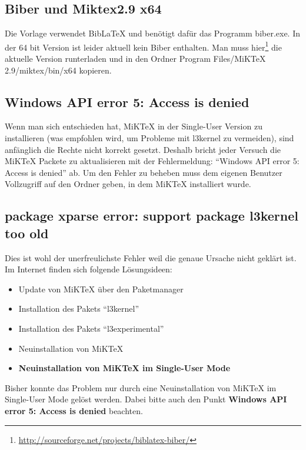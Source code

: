 \subsection{Biber und Miktex2.9 x64}
Die Vorlage verwendet BibLaTeX und benötigt dafür das Programm biber.exe.
In der 64 bit Version ist leider aktuell kein Biber enthalten.
Man muss hier\footnote{\url{http://sourceforge.net/projects/biblatex-biber/}} die aktuelle Version runterladen und in den Ordner Program Files/MiKTeX 2.9/miktex/bin/x64 kopieren.

\subsection{Windows API error 5: Access is denied}
Wenn man sich entschieden hat, MiKTeX in der Single-User Version zu installieren (was empfohlen wird, um Probleme mit l3kernel zu vermeiden), sind anfänglich die Rechte nicht korrekt gesetzt. 
Deshalb bricht jeder Versuch die MiKTeX Packete zu aktualisieren mit der Fehlermeldung: "`Windows API error 5: Access is denied"' ab.
Um den Fehler zu beheben muss dem eigenen Benutzer Vollzugriff auf den Ordner geben, in dem MiKTeX installiert wurde.

\subsection{package xparse error: support package l3kernel too old}
Dies ist wohl der unerfreulichste Fehler weil die genaue Ursache nicht geklärt ist.
Im Internet finden sich folgende Lösungsideen:
\begin{itemize}
	\item Update von MiKTeX über den Paketmanager
	\item Installation des Pakets "`l3kernel"'
	\item Installation des Pakets "`l3experimental"'
	\item Neuinstallation von MiKTeX
	\item \textbf{Neuinstallation von MiKTeX im Single-User Mode}
\end{itemize}
Bisher konnte das Problem nur durch eine Neuinstallation von MiKTeX im Single-User Mode gelöst werden. Dabei bitte auch den Punkt \textbf{Windows API error 5: Access is denied} beachten.

